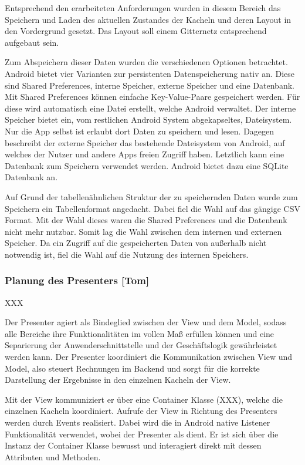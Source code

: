 Entsprechend den erarbeiteten Anforderungen wurden in diesem Bereich das Speichern und Laden des aktuellen Zustandes der Kacheln und deren Layout in den Vordergrund gesetzt. Das Layout soll einem Gitternetz entsprechend aufgebaut sein.

Zum Abspeichern dieser Daten wurden die verschiedenen Optionen betrachtet. Android bietet vier Varianten zur persistenten Datenspeicherung nativ an. Diese sind Shared Preferences, interne Speicher, externe Speicher und eine Datenbank. Mit Shared Preferences können einfache Key-Value-Paare gespeichert werden. Für diese wird automatisch eine Datei erstellt, welche Android verwaltet. Der interne Speicher bietet ein, vom restlichen Android System abgekapseltes, Dateisystem. Nur die App selbst ist erlaubt dort Daten zu speichern und lesen. Dagegen beschreibt der externe Speicher das bestehende Dateisystem von Android, auf welches der Nutzer und andere Apps freien Zugriff haben. Letztlich kann eine Datenbank zum Speichern verwendet werden. Android bietet dazu eine SQLite Datenbank an.

Auf Grund der tabellenähnlichen Struktur der zu speichernden Daten wurde zum Speichern ein Tabellenformat angedacht. Dabei fiel die Wahl auf das gängige CSV Format. Mit der Wahl dieses waren die Shared Preferences und die Datenbank nicht mehr nutzbar. Somit lag die Wahl zwischen dem internen und externen Speicher. Da ein Zugriff auf die gespeicherten Daten von außerhalb nicht notwendig ist, fiel die Wahl auf die Nutzung des internen Speichers. 

\clearpage

\subsubsection{Planung des Presenters [Tom]}

XXX

Der Presenter agiert als Bindeglied zwischen der View und dem Model, sodass alle Bereiche ihre Funktionalitäten im vollen Maß erfüllen können und eine Separierung der Anwenderschnittstelle und der Geschäftslogik gewährleistet werden kann. Der Presenter koordiniert die Kommunikation zwischen View und Model, also steuert Rechnungen im Backend und sorgt für die korrekte Darstellung der Ergebnisse in den einzelnen Kacheln der View.

Mit der View kommuniziert er über eine Container Klasse (XXX), welche die einzelnen Kacheln koordiniert. Aufrufe der View in Richtung des Presenters werden durch Events realisiert. Dabei wird die in Android native Listener Funktionalität verwendet, wobei der Presenter als  dient. Er ist sich über die Instanz der Container Klasse bewusst und interagiert direkt mit dessen Attributen und Methoden.

